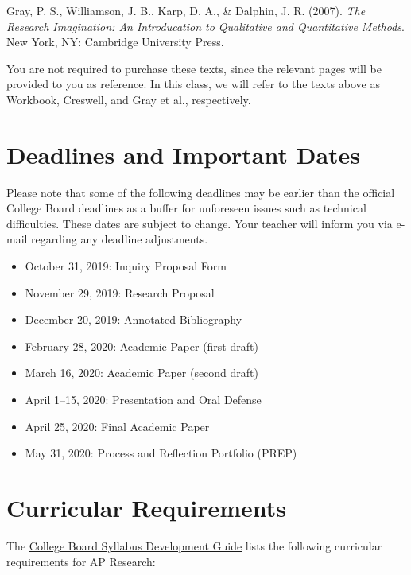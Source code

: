 \documentclass[11pt,]{article}
\providecommand{\tightlist}{%
  \setlength{\itemsep}{0pt}\setlength{\parskip}{0pt}}
\begin{document}
Gray, P. S., Williamson, J. B., Karp, D. A., \& Dalphin, J. R.
(2007). \emph{The Research Imagination: An Introducation to Qualitative
and Quantitative Methods}. New York, NY: Cambridge University
Press.

You are not required to purchase these texts, since the relevant pages will be provided to you as reference. In this class, we will refer to the texts above as Workbook, Creswell, and Gray et al., respectively.

\hypertarget{deadlines-and-important-dates}{%
\section{Deadlines and Important Dates}\label{deadlines-and-important-dates}}

Please note that some of the following deadlines may be earlier than the official College Board deadlines as a buffer for unforeseen issues such as technical difficulties. These dates are subject to change. Your teacher will inform you via e-mail regarding any deadline adjustments.

\begin{itemize}
\tightlist
\item
  October 31, 2019: Inquiry Proposal Form
\item
  November 29, 2019: Research Proposal
\item
  December 20, 2019: Annotated Bibliography
\item
  February 28, 2020: Academic Paper (first draft)
\item
  March 16, 2020: Academic Paper (second draft)
\item
  April 1--15, 2020: Presentation and Oral Defense
\item
  April 25, 2020: Final Academic Paper
\item
  May 31, 2020: Process and Reflection Portfolio (PREP)
\end{itemize}

\hypertarget{curricular-requirements}{%
\section{Curricular Requirements}\label{curricular-requirements}}

The \href{https://secure-media.collegeboard.org/digitalServices/pdf/ap/ap-course-audit/ap-research-syllabus-development-guide.pdf}{College Board Syllabus Development Guide} lists the following curricular requirements for AP Research:
\end{document}
